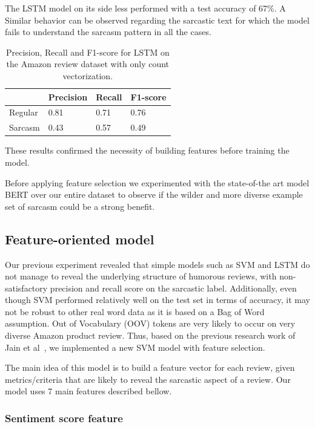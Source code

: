\documentclass[10pt,twocolumn,letterpaper]{article}
\begin{document}
The LSTM model on its side less performed with a test accuracy of 67\%.
A Similar behavior can be observed regarding the sarcastic text for which the model fails to understand the sarcasm pattern in all the cases.

\begin{table}[H]
    \centering
    \begin{tabularx}{\linewidth}{|X|X|X|X|}
        \hline
        & Precision & Recall & F1-score \\
        \hline
        Regular & 0.81 & 0.71 & 0.76 \\
        \hline
        Sarcasm & 0.43 & 0.57 & 0.49 \\
        \hline
    \end{tabularx}
    \caption{Precision, Recall and F1-score for LSTM on the Amazon review dataset with only count vectorization.}
\end{table}

These results confirmed the necessity of building features before training the model.

Before applying feature selection we experimented with the state-of-the art model BERT over our entire dataset to observe if the wilder and more diverse example set of sarcasm could be a strong benefit.

\subsection{Feature-oriented model}

Our previous experiment revealed that simple models such as SVM and LSTM do not manage to reveal the underlying structure of humorous reviews, with non-satisfactory precision and recall score on the sarcastic label.
Additionally, even though SVM performed relatively well on the test set in terms of accuracy, it may not be robust to other real word data as it is based on a Bag of Word assumption. Out of Vocabulary (OOV) tokens are very likely to occur on very diverse Amazon product review.
Thus, based on the previous research work of Jain et al~\cite{jain2019}, we implemented a new SVM model with feature selection.

The main idea of this model is to build a feature vector for each review, given metrics/criteria that are likely to reveal the sarcastic aspect of a review.
Our model uses 7 main features described bellow.

\subsubsection{Sentiment score feature}
\end{document}

